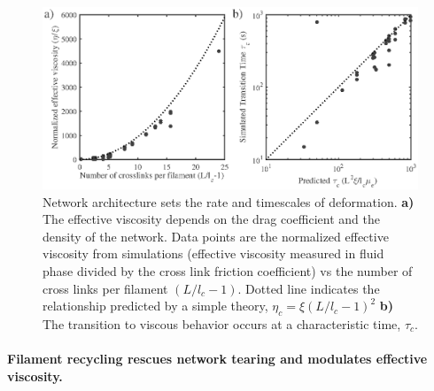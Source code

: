 \documentclass[10pt,letterpaper]{article}
\begin{document}
\begin{figure}[h!]
\centering
\includegraphics[width=\hsize]{figures/figure3}
\caption{\label{fig:passive_form} Network architecture sets the rate and timescales of deformation. \textbf{a)} The effective viscosity depends on the drag coefficient and the density of the network. Data points are the normalized effective viscosity from simulations (effective viscosity measured in fluid phase divided by the cross link friction coefficient) vs the number of cross links per filament $(L/l_c - 1)$.  Dotted line indicates the relationship predicted by a simple theory, $\eta_c = \xi(L/l_c-1)^2$ \textbf{b)} The transition to viscous behavior occurs at a characteristic time, $\tau_c$.  }
\end{figure}


\paragraph{Filament recycling rescues network tearing and modulates effective viscosity.} 
 
\end{document}
